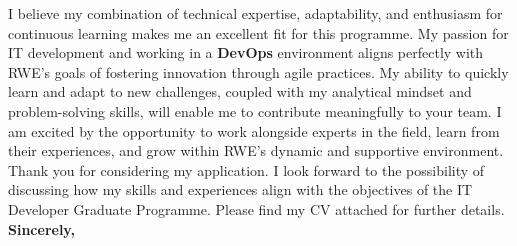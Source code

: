 \documentclass[a4paper,12pt]{article}
\begin{document}
I believe my combination of technical expertise, adaptability, and enthusiasm for continuous learning makes me an excellent fit for this programme. My passion for IT development and working in a \textbf{DevOps} environment aligns perfectly with RWE’s goals of fostering innovation through agile practices. My ability to quickly learn and adapt to new challenges, coupled with my analytical mindset and problem-solving skills, will enable me to contribute meaningfully to your team. I am excited by the opportunity to work alongside experts in the field, learn from their experiences, and grow within RWE’s dynamic and supportive environment.
\\
Thank you for considering my application. I look forward to the possibility of discussing how my skills and experiences align with the objectives of the IT Developer Graduate Programme. Please find my CV attached for further details.
\\
\textbf{Sincerely,}
\end{document}
